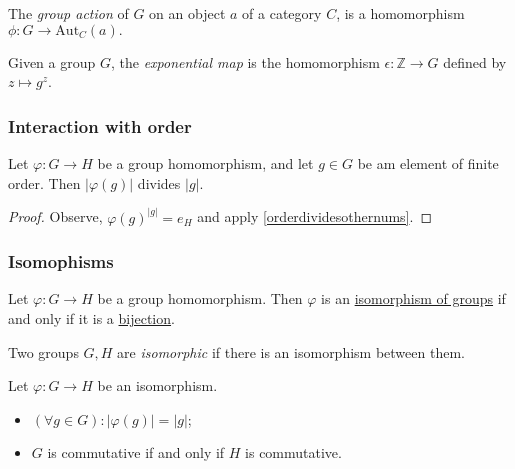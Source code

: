 \label{groupactionmorphism}
The \emph{group action} of $G$ on an object $a$ of a category $C$, is a homomorphism $\phi : G \rightarrow \textrm{Aut}_C(a).$

\label{exponentialmap}
Given a group $G$, the \emph{exponential map} is the homomorphism $\epsilon : \mathbb{Z} \rightarrow G$ defined by $z \mapsto g^z$.

\subsubsection{Interaction with order}\label{homomorphismsandorder}

\begin{proposition}
Let $\varphi : G \rightarrow H$ be a group homomorphism, and let $g \in G$ be am element of finite order. Then $|\varphi(g)|$ divides $|g|$.
\end{proposition}

\begin{proof}
Observe, $\varphi(g)^{|g|} = e_H$ and apply \ref{orderdividesothernums}.
\end{proof}

\subsubsection{Isomophisms}\label{groupisomorphisms}
\begin{proposition}
Let $\varphi : G \rightarrow H$ be a group homomorphism. Then $\varphi$ is an \hyperref[isomorphism]{isomorphism of groups} if
and only if it is a \hyperref[bijection]{bijection}.
\end{proposition}

\noindent Two groups $G,H$ are \emph{isomorphic}\label{isomorphicgroups} if there is an isomorphism between them.

\begin{proposition}
Let $\varphi : G \rightarrow H$ be an isomorphism.
\begin{itemize}
  \item $(\forall g \in G) : |\varphi(g)| = |g|$;
  \item $G$ is commutative if and only if $H$ is commutative.
\end{itemize}
\end{proposition}